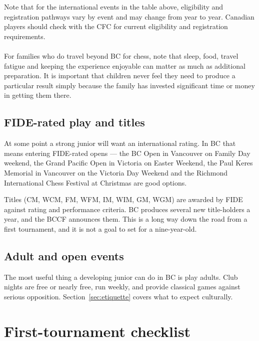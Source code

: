 \documentclass[10pt,letterpaper]{article}
\begin{document}
Note that for the international events in the table above, eligibility and registration pathways vary by event and may change from year to year. Canadian players should check with the CFC for current eligibility and registration requirements.

\paragraph{} For families who do travel beyond BC for chess, note that sleep, food, travel fatigue and keeping the experience enjoyable can matter as much as additional preparation. It is important that children never feel they need to produce a particular result simply because the family has invested significant time or money in getting them there.

\subsection{FIDE-rated play and titles}

At some point a strong junior will want an international rating. In BC that
means entering FIDE-rated opens --- the BC Open in Vancouver on Family Day weekend, the Grand Pacific
Open in Victoria on Easter Weekend, the Paul Keres Memorial in Vancouver on the Victoria
Day Weekend and the Richmond International Chess Festival at Christmas are good
options.

Titles (CM, WCM, FM, WFM, IM, WIM, GM, WGM) are awarded by FIDE against rating
and performance criteria. BC produces several new title-holders a year, and the
BCCF announces them. This is a long way down the road from a first tournament,
and it is not a goal to set for a nine-year-old.

\subsection{Adult and open events}

The most useful thing a developing junior can do in BC is play adults. Club
nights are free or nearly free, run weekly, and provide classical games against
serious opposition. Section \ref{sec:etiquette} covers what to expect culturally.

\newpage
\appendix

\section{First-tournament checklist}
\label{app:checklist}
\end{document}
